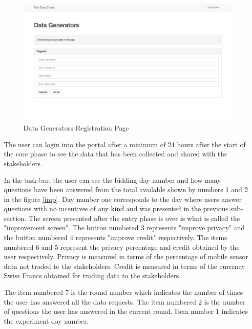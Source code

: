 \begin{figure}[ht!]
\centering
\includegraphics[width=\textwidth,keepaspectratio]{./images/fds_user_register}
\caption{Data Generators Registration Page}
\label{fig:first}
\end{figure}

The user can  login into the portal after a minimum of 24 hours after the start of the core phase to see the data that has been collected and shared with the stakeholders. 

In the task-bar, the user can see the bidding day number and how many questions have been answered from the total available shown by numbers 1 and 2 in the figure \ref{imp}. Day number one
corresponds to the day where users answer questions with no incentives of any kind and was presented in the previous sub-section. The screen presented after the entry phase is over is what is called the "improvement screen". 
The button numbered 3
represents "improve privacy" and the button numbered 4 represents "improve credit" respectively. The items numbered 6 and 5 represent the privacy percentage and credit obtained by the user respectively. Privacy is measured in terms of the percentage of mobile sensor data not traded to the stakeholders. Credit is measured in terms of the currency Swiss Francs obtained for trading data to the stakeholders. 

The item numbered 7 is the round number which indicates the number of times the user has answered all the data requests. The item numbered 2 is the number of questions the user has answered in the current round. Item number 1 indicates the experiment day number.



